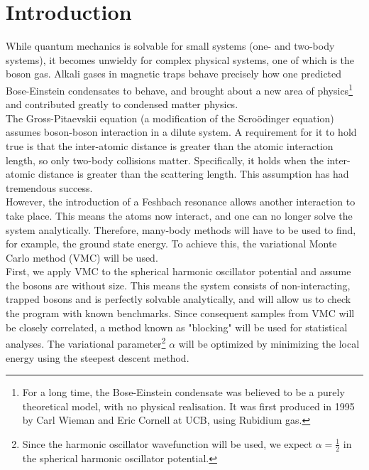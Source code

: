 \documentclass[english, a4paper]{article}
\begin{document}
\tableofcontents
\newpage
{}%


\section{Introduction}
While quantum mechanics is solvable for small systems (one- and two-body systems), it becomes unwieldy for complex physical systems, one of which is the boson gas. Alkali gases in magnetic traps behave precisely how one predicted Bose-Einstein condensates to behave, and brought about a new area of physics\footnote{For a long time, the Bose-Einstein condensate was believed to be a purely theoretical model, with no physical realisation. It was first produced in 1995 by Carl Wieman and Eric Cornell at UCB, using Rubidium gas.} and contributed greatly to condensed matter physics.\\
The Gross-Pitaevskii equation (a modification of the Scro\"odinger equation) assumes boson-boson interaction in a dilute system. A requirement for it to hold true is that the inter-atomic distance is greater than the atomic interaction length, so only two-body collisions matter. Specifically, it holds when the inter-atomic distance is greater than the scattering length. This assumption has had tremendous success.\\
However, the introduction of a Feshbach resonance allows another interaction to take place. This means the atoms now interact, and one can no longer solve the system analytically. 
Therefore, many-body methods will have to be used to find, for example, the ground state energy. 
To achieve this, the variational Monte Carlo method (VMC) will be used.\\
First, we apply VMC to the spherical harmonic oscillator potential and assume the bosons are without size. 
This means the system consists of non-interacting, trapped bosons and is perfectly solvable analytically, and will allow us to check the program with known benchmarks. 
Since consequent samples from VMC will be closely correlated, a method known as "blocking" will be used for statistical analyses. 
The variational parameter\footnote{Since the harmonic oscillator wavefunction will be used, we expect $\alpha = \frac{1}{2}$ in the spherical harmonic oscillator potential.} $\alpha$ will be optimized by minimizing the local energy using the steepest descent method. 
\end{document}
